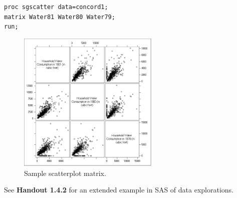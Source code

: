 \documentclass[12pt]{notes}
\begin{document}
\begin{itemize}
\begin{verbatim}
proc sgscatter data=concord1;
matrix Water81 Water80 Water79;
run;

\end{verbatim}

\begin{figure}[H]
\centering
\includegraphics[width = 0.6\textwidth]{figures/module1/sampScatter.png}
\caption{Sample scatterplot matrix.}
\end{figure}

\end{itemize} %

\nspace
See \textbf{Handout 1.4.2} for an extended example in SAS of data explorations. 

















\end{document}

